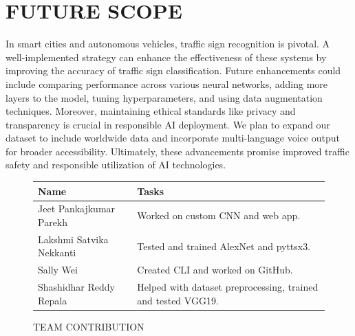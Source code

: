 \documentclass[conference]{IEEEtran}
\begin{document}
\section{FUTURE SCOPE}
In smart cities and autonomous vehicles, traffic sign recognition is pivotal. A well-implemented strategy can enhance the effectiveness of these systems by improving the accuracy of traffic sign classification. Future enhancements could include comparing performance across various neural networks, adding more layers to the model, tuning hyperparameters, and using data augmentation techniques. Moreover, maintaining ethical standards like privacy and transparency is crucial in responsible AI deployment. We plan to expand our dataset to include worldwide data and incorporate multi-language voice output for broader accessibility. Ultimately, these advancements promise improved traffic safety and responsible utilization of AI technologies.
\begin{figure}[htbp]
\caption{ TEAM CONTRIBUTION}
\centering
\begin{minipage}{0.5\textwidth}
\renewcommand{\arraystretch}{1.2} %
\setlength{\tabcolsep}{3pt} %
\begin{tabularx}{\linewidth}{|>{\raggedright\arraybackslash}X|>{\raggedright\arraybackslash}p{4cm}|}
\hline
\rowcolor{black!10} %
\textbf{Name} & \textbf{Tasks} \\ \hline
Jeet Pankajkumar Parekh & Worked on custom CNN and web app. \\
Lakshmi Satvika Nekkanti & Tested and trained AlexNet and pyttsx3. \\
Sally Wei & Created CLI and worked on GitHub. \\
Shashidhar Reddy Repala & Helped with dataset preprocessing, trained and tested VGG19. \\
\hline
\end{tabularx}
\end{minipage}
\end{figure}
\end{document}
